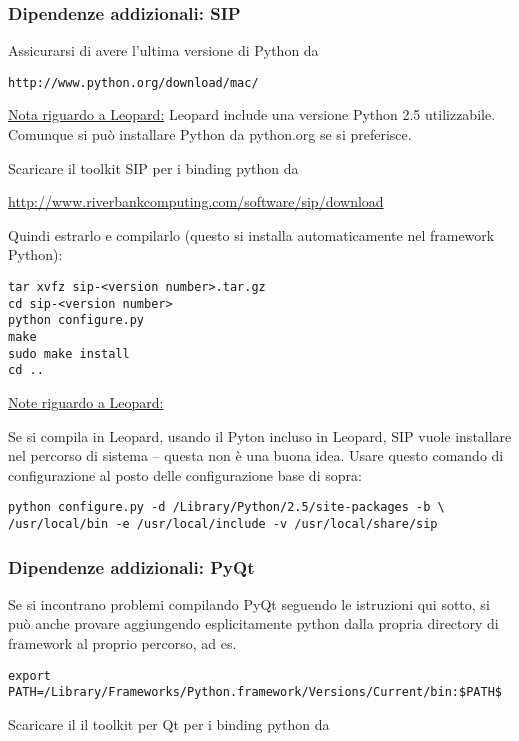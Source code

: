\subsubsection{Dipendenze addizionali: SIP}
Assicurarsi di avere l'ultima versione di Python da 

\begin{verbatim}
http://www.python.org/download/mac/
\end{verbatim}

\underline{Nota riguardo a Leopard:} Leopard include una versione Python 2.5 utilizzabile.  Comunque si può installare  Python da python.org se si preferisce.

Scaricare il toolkit SIP per i binding python da

\url{http://www.riverbankcomputing.com/software/sip/download}

Quindi estrarlo e compilarlo (questo si installa automaticamente nel framework Python):

\begin{verbatim}
tar xvfz sip-<version number>.tar.gz 
cd sip-<version number>
python configure.py 
make 
sudo make install 
cd ..  
\end{verbatim}

\underline{Note riguardo a Leopard:}

Se si compila in Leopard, usando il Pyton incluso in Leopard, SIP vuole installare nel percorso di sistema -- questa non è una buona idea. Usare questo comando di configurazione al posto delle configurazione base di sopra:

\begin{verbatim}
python configure.py -d /Library/Python/2.5/site-packages -b \
/usr/local/bin -e /usr/local/include -v /usr/local/share/sip
\end{verbatim}

\subsubsection{Dipendenze addizionali: PyQt}
Se si incontrano problemi compilando PyQt seguendo le istruzioni qui sotto, si può anche provare aggiungendo esplicitamente python dalla propria directory di framework al proprio percorso, ad es.

\begin{verbatim}
export PATH=/Library/Frameworks/Python.framework/Versions/Current/bin:$PATH$
\end{verbatim}

Scaricare il il toolkit per Qt per i binding python da

